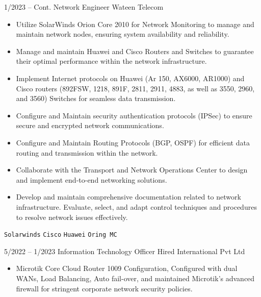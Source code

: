 \documentclass[9pt]{developercv} %
\begin{document}
\vspace{-10 pt}
\begin{entrylist}
	\entry
        {1/2023 -- Cont.}
		{Network Engineer}
		{Wateen Telecom}
		{\vspace{-10pt}
        \begin{itemize}[noitemsep,topsep=0pt,parsep=0pt,partopsep=0pt, leftmargin=-1pt]
            \item Utilize SolarWinds Orion Core 2010 for Network Monitoring to manage and maintain network nodes, ensuring system availability and reliability.
            \item Manage and maintain Huawei and Cisco Routers and Switches to guarantee their optimal performance within the network infrastructure.
            \item Implement Internet protocols on Huawei (Ar 150, AX6000, AR1000) and Cisco routers (892FSW, 1218, 891F, 2811, 2911, 4883, as well as 3550, 2960, and 3560) Switches for seamless data transmission.
            \item Configure and Maintain security authentication protocols (IPSec) to ensure secure and encrypted network communications.
            \item Configure and Maintain Routing Protocols (BGP, OSPF) for efficient data routing and transmission within the network.
            \item Collaborate with the Transport and Network Operations Center to design and implement end-to-end networking solutions.
            \item Develop and maintain comprehensive documentation related to network infrastructure. Evaluate, select, and adapt control techniques and procedures to resolve network issues effectively.
        \end{itemize} 
        \texttt{Solarwinds} \slashsep \texttt{Cisco} \slashsep \texttt{Huawei} \slashsep \texttt{Oring MC}}
	\entry
		{5/2022 -- 1/2023}
		{Information Technology Officer}
		{Hired International Pvt Ltd}
		{\vspace{-10pt}
        \begin{itemize}[noitemsep,topsep=0pt,parsep=0pt,partopsep=0pt, leftmargin=-1pt]
    \item Microtik Core Cloud Router 1009 Configuration, Configured with dual WANs, Load Balancing, Auto fail-over, and maintained Microtik's advanced firewall for stringent corporate network security policies.
    

\end{itemize}}
\end{entrylist}
\end{document}
